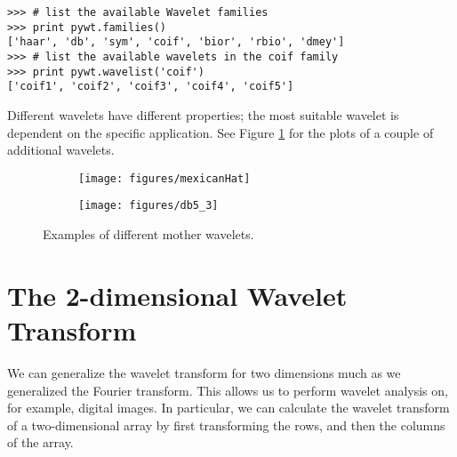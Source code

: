 \begin{lstlisting}
>>> # list the available Wavelet families
>>> print pywt.families()
['haar', 'db', 'sym', 'coif', 'bior', 'rbio', 'dmey']
>>> # list the available wavelets in the coif family
>>> print pywt.wavelist('coif')
['coif1', 'coif2', 'coif3', 'coif4', 'coif5']

\end{lstlisting}
Different wavelets have different properties; the most suitable wavelet is dependent on the specific application.
See Figure \ref{fig:more_wavelets} for the plots of a couple of additional wavelets.
\begin{figure}
\begin{subfigure}[b]{0.45\textwidth}
    \texttt{[image: figures/mexicanHat]}
\end{subfigure}
\begin{subfigure}[b]{0.45\textwidth}
    \texttt{[image: figures/db5\_3]}
\end{subfigure}
\caption{Examples of different mother wavelets.}
\label{fig:more_wavelets}
\end{figure}

\section*{The 2-dimensional Wavelet Transform} %

We can generalize the wavelet transform for two dimensions much as we generalized the Fourier transform.
This allows us to perform wavelet analysis on, for example, digital images.
In particular, we can calculate the wavelet transform of a two-dimensional
array  by first transforming the rows, and then the columns of the array.

